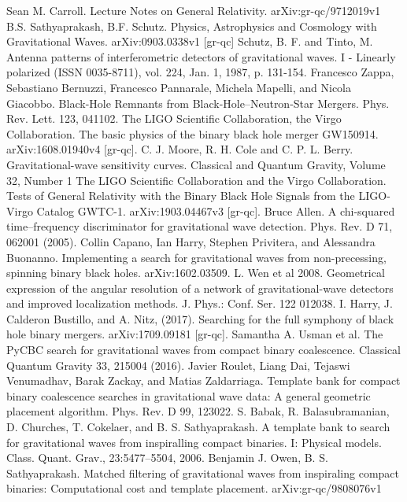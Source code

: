 \documentclass[binding=0.6cm, LaM]{sapthesis}
\begin{document}
\begin{thebibliography}{500}
	 Sean M. Carroll. Lecture Notes on General Relativity. arXiv:gr-qc/9712019v1
	 B.S. Sathyaprakash, B.F. Schutz. Physics, Astrophysics and Cosmology with Gravitational Waves. arXiv:0903.0338v1 [gr-qc]
	 Schutz, B. F. and Tinto, M. Antenna patterns of interferometric detectors of gravitational waves. I - Linearly polarized (ISSN 0035-8711), vol. 224, Jan. 1, 1987, p. 131-154.
	 Francesco Zappa, Sebastiano Bernuzzi, Francesco Pannarale, Michela Mapelli, and Nicola Giacobbo. Black-Hole Remnants from Black-Hole–Neutron-Star Mergers. Phys. Rev. Lett. 123, 041102. 
	 The LIGO Scientific Collaboration, the Virgo Collaboration. The basic physics of the binary black hole merger GW150914. arXiv:1608.01940v4 [gr-qc].
	 C. J. Moore, R. H. Cole and C. P. L. Berry. Gravitational-wave sensitivity curves. Classical and Quantum Gravity, Volume 32, Number 1
	 The LIGO Scientific Collaboration and the Virgo Collaboration. Tests of General Relativity with the Binary Black Hole Signals from the LIGO-Virgo Catalog GWTC-1. arXiv:1903.04467v3 [gr-qc].
	 Bruce Allen. A chi-squared time–frequency discriminator for gravitational wave detection. Phys. Rev. D 71, 062001 (2005).
  	 Collin Capano, Ian Harry, Stephen Privitera, and Alessandra Buonanno. Implementing a search for gravitational waves from non-precessing, spinning binary black holes. arXiv:1602.03509.
  	 L. Wen et al 2008. Geometrical expression of the angular resolution of a network of gravitational-wave detectors and improved localization methods. J. Phys.: Conf. Ser. 122 012038.
	 I. Harry, J. Calderon Bustillo, and A. Nitz, (2017). Searching for the full symphony of black hole binary mergers. arXiv:1709.09181 [gr-qc]. 
  	 Samantha A. Usman et al. The PyCBC search for gravitational waves from compact binary coalescence.  Classical Quantum Gravity 33, 215004 (2016). 
  	 Javier Roulet, Liang Dai, Tejaswi Venumadhav, Barak Zackay, and Matias Zaldarriaga. Template bank for compact binary coalescence searches in gravitational wave data: A general geometric placement algorithm. Phys. Rev. D 99, 123022. 
	 S. Babak, R. Balasubramanian, D. Churches, T. Cokelaer, and B. S. Sathyaprakash. A template bank to search for gravitational waves from inspiralling compact binaries. I: Physical models. Class. Quant. Grav., 23:5477–5504, 2006. 
	 Benjamin J. Owen, B. S. Sathyaprakash. Matched filtering of gravitational waves from inspiraling compact binaries: Computational cost and template placement. arXiv:gr-qc/9808076v1

\end{thebibliography}
\end{document}
